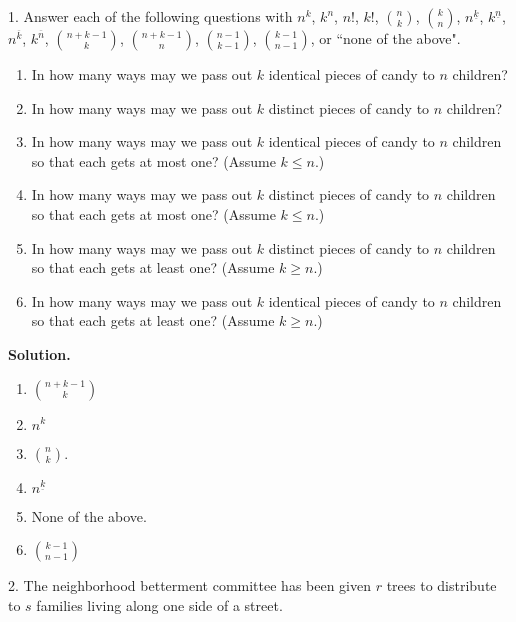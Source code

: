 \documentclass[10pt,]{book}
\theoremstyle{plain}
\theoremstyle{definition}
\theoremstyle{definition}
\numberwithin{equation}{chapter}
\begin{document}
\begin{exerciselist}
\item[1.]\hypertarget{exercise-23}{}Answer each of the following questions with \(n^k\), \(k^n\), \(n!\), \(k!\), \(\binom{n}{k}\), \(\binom{k}{n}\), \(n^{\underline{k}}\), \(k^{\underline{n}}\), \(n^{\overline{k}}\), \(k^{\overline{n}}\), \(\binom{n+k-1}{k}\), \(\binom{n+k-1}{n}\), \(\binom{n-1}{k-1}\), \(\binom{k-1}{n-1}\), or ``none of the above". \leavevmode%
\begin{enumerate}[label=(\alph*)]
\item\hypertarget{li-42}{}In how many ways may we pass out \(k\) identical pieces of candy to \(n\) children?%
\item\hypertarget{li-43}{}In how many ways may we pass out \(k\) distinct pieces of candy to \(n\) children?%
\item\hypertarget{li-44}{}In how many ways may we pass out \(k\) identical pieces of candy to \(n\) children so that each gets at most one?  (Assume \(k\le n\).)%
\item\hypertarget{li-45}{}In how many ways may we pass out \(k\) distinct pieces of candy to \(n\) children so that each gets at most one?  (Assume \(k\le n\).)%
\item\hypertarget{li-46}{}In how many ways may we pass out \(k\) distinct pieces of candy to \(n\) children so that each gets at least one?  (Assume \(k\ge n\).)%
\item\hypertarget{li-47}{}In how many ways may we pass out \(k\) identical pieces of candy to \(n\) children so that each gets at least one?  (Assume \(k\ge n\).)%
\end{enumerate}
%
\par\smallskip
\par\smallskip
\noindent\textbf{Solution.}\hypertarget{solution-269}{}\quad
\leavevmode%
\begin{enumerate}[label=(\alph*)]
\item\hypertarget{li-48}{}\(\binom{n+k-1}{k}\)%
\item\hypertarget{li-49}{}\(n^k\)%
\item\hypertarget{li-50}{}\(\binom{n}{k}\).%
\item\hypertarget{li-51}{}\(n^{\underline{k}}\)%
\item\hypertarget{li-52}{}None of the above.%
\item\hypertarget{li-53}{}\(\binom{k-1}{n-1}\)%
\end{enumerate}
%
\item[2.]\hypertarget{exercise-24}{}The neighborhood betterment committee has been given \(r\) trees to distribute to \(s\) families living along one side of a street. \leavevmode%

\end{exerciselist}
\end{document}

